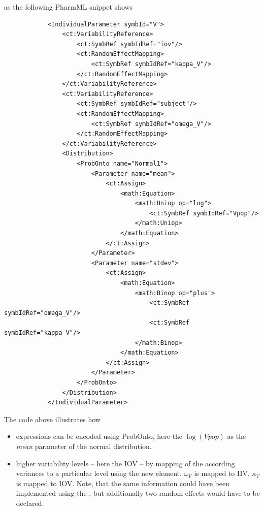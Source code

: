 as the following PharmML snippet shows
\lstset{language=XML}
\begin{lstlisting}
            <IndividualParameter symbId="V">
                <ct:VariabilityReference>
                    <ct:SymbRef symbIdRef="iov"/>
                    <ct:RandomEffectMapping>
                        <ct:SymbRef symbIdRef="kappa_V"/>
                    </ct:RandomEffectMapping>
                </ct:VariabilityReference>
                <ct:VariabilityReference>
                    <ct:SymbRef symbIdRef="subject"/>
                    <ct:RandomEffectMapping>
                        <ct:SymbRef symbIdRef="omega_V"/>
                    </ct:RandomEffectMapping>
                </ct:VariabilityReference>
                <Distribution>
                    <ProbOnto name="Normal1">
                        <Parameter name="mean">
                            <ct:Assign>
                                <math:Equation>
                                    <math:Uniop op="log">
                                        <ct:SymbRef symbIdRef="Vpop"/>
                                    </math:Uniop>
                                </math:Equation>
                            </ct:Assign>
                        </Parameter>
                        <Parameter name="stdev">
                            <ct:Assign>
                                <math:Equation>
                                    <math:Binop op="plus">
                                        <ct:SymbRef symbIdRef="omega_V"/>
                                        <ct:SymbRef symbIdRef="kappa_V"/>
                                    </math:Binop>
                                </math:Equation>
                            </ct:Assign>
                        </Parameter>
                    </ProbOnto>
                </Distribution>
            </IndividualParameter>
\end{lstlisting}
The code above illustrates how 
\begin{itemize}
\item 
expressions can be encoded using ProbOnto,
here the $\log(Vpop)$ as the \emph{mean} parameter of the normal distribution.
\item
higher variability levels -- here the IOV -- by mapping of the according variances
to a particular level using the new  element. $\omega_V$
is mapped to IIV, $\kappa_V$ is mapped to IOV. Note, that the same information could 
have been implemented using the , but additionally two random 
effects would have to be declared.
\end{itemize}

